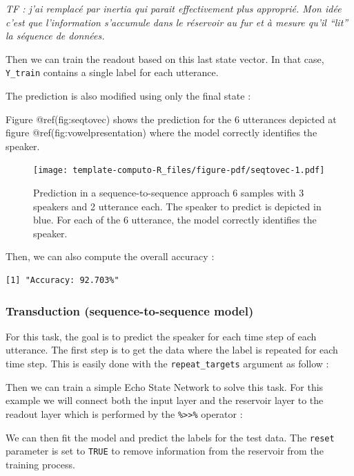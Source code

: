 \documentclass[
  11pt,
  a4paper,
]{article}
\theoremstyle{plain}
\theoremstyle{remark}
\begin{document}
\emph{TF : j'ai remplacé par inertia qui parait effectivement plus
approprié. Mon idée c'est que l'information s'accumule dans le réservoir
au fur et à mesure qu'il ``lit'' la séquence de données.}

Then we can train the readout based on this last state vector. In that
case, \texttt{Y\_train} contains a single label for each utterance.

The prediction is also modified using only the final state :

Figure @ref(fig:seqtovec) shows the prediction for the 6 utterances
depicted at figure @ref(fig:vowelpresentation) where the model correctly
identifies the speaker.

\begin{figure}[H]

{\centering \texttt{[image: template-computo-R\_files/figure-pdf/seqtovec-1.pdf]}

}

\caption{Prediction in a sequence-to-sequence approach 6 samples with 3
speakers and 2 utterance each. The speaker to predict is depicted in
blue. For each of the 6 utterance, the model correctly identifies the
speaker.}

\end{figure}%

Then, we can also compute the overall accuracy :

\begin{verbatim}
[1] "Accuracy: 92.703%"
\end{verbatim}

\subsubsection{Transduction (sequence-to-sequence
model)}\label{transduction-sequence-to-sequence-model}

For this task, the goal is to predict the speaker for each time step of
each utterance. The first step is to get the data where the label is
repeated for each time step. This is easily done with the
\texttt{repeat\_targets} argument as follow :

Then we can train a simple Echo State Network to solve this task. For
this example we will connect both the input layer and the reservoir
layer to the readout layer which is performed by the
\texttt{\%\textgreater{}\textgreater{}\%} operator :

We can then fit the model and predict the labels for the test data. The
\texttt{reset} parameter is set to \texttt{TRUE} to remove information
from the reservoir from the training process.
\end{document}
